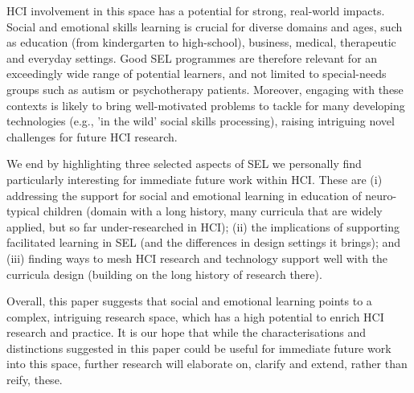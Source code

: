 \documentclass[prodmode,acmtochi]{acmsmall}
\newcommand{\todo}[1]{\textrm{\textrm{\textcolor{LightBlue}{[[#1]]}}}}
\begin{document}
HCI involvement in this space has a potential for strong, real-world impacts.
%
Social and emotional skills learning is crucial for diverse domains and ages, such as education (from kindergarten to high-school), business, medical, therapeutic and everyday settings. Good SEL programmes are therefore relevant for an exceedingly wide range of potential learners, and not limited to special-needs groups such as autism or psychotherapy patients.
%
Moreover, engaging with these contexts is likely to bring well-motivated problems to tackle for many developing technologies (e.g., 'in the wild' social skills processing), raising intriguing novel challenges for future HCI research. 


We end by highlighting three selected aspects of SEL we personally find particularly interesting for immediate future work within HCI. These are (i) addressing the support for social and emotional learning in education of neuro-typical children (domain with a long history, many curricula that are widely applied, but so far under-researched in HCI); (ii) the implications of supporting facilitated learning in SEL (and the differences in design settings it brings); and (iii) finding ways to mesh HCI research and technology support well with the curricula design (building on the long history of research there). 
%                
 

Overall, this paper suggests that social and emotional learning points to a complex, intriguing research space, which has a high potential to enrich HCI research and practice. 
%
It is our hope that while the characterisations and distinctions suggested in this paper could be useful for immediate future work into this space, further research will elaborate on, clarify and extend, rather than reify, these.


 



%
%
%


\end{document}
